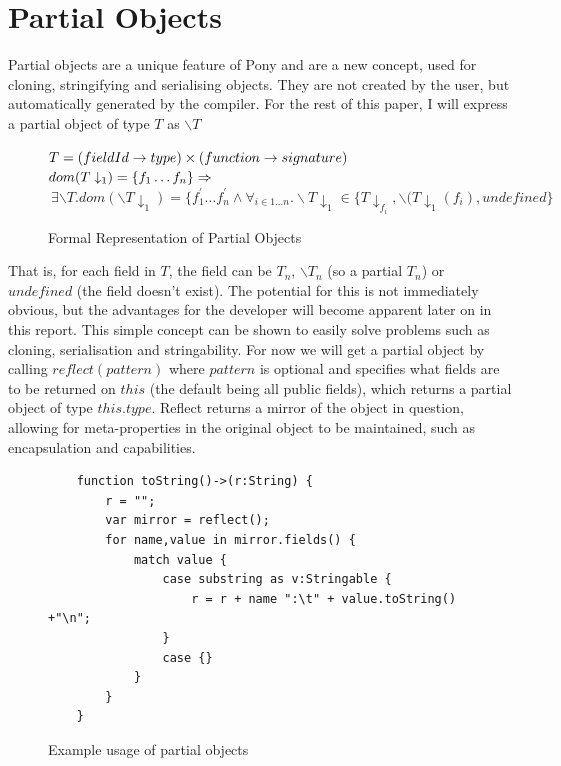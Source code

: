 \documentclass[pdftex,11pt,a4paper]{report}
\begin{document}
\section{Partial Objects}

Partial objects are a unique feature of Pony and are a new concept, used for cloning, stringifying and serialising objects.
They are not created by the user, but automatically generated by the compiler.
For the rest of this paper, I will express a partial object of type $T$ as $\backslash T$

\begin{figure}[H]
$T = (fieldId \to type) \times (function \to signature)\\$
$dom(T\downarrow_{1}) = \{ f_{1} \dots f_{n} \} \Rightarrow\\$
$\> \exists \backslash T.dom(\backslash T\downarrow_{1}) = \{f_{1}^{'}\dots f_{n}^{'}\wedge
\forall_{i\in 1\dots n}.\backslash T\downarrow_{1} \in \{T\downarrow_{f_{i}},
\backslash(T\downarrow_{1}(f_{i}), undefined\}$
\caption{Formal Representation of Partial Objects}
\end{figure}

That is, for each field in $T$, the field can be $T_{n}$, $\backslash T_{n}$ (so a partial $T_{n}$) or $undefined$ (the field doesn't exist).
The potential for this is not immediately obvious, but the advantages for the developer will become apparent later on in this report.
This simple concept can be shown to easily solve problems such as cloning, serialisation and stringability.
For now we will get a partial object by calling $reflect(pattern)$ where $pattern$ is optional and specifies what fields are to be returned on $this$ (the default being all public fields), which returns a partial object of type $this.type$.
Reflect returns a mirror\cite{mirror-paper} of the object in question, allowing for meta-properties in the original object to be maintained, such as encapsulation and capabilities.

\begin{figure}[H]
\begin{verbatim}
    function toString()->(r:String) {
        r = "";
        var mirror = reflect();
        for name,value in mirror.fields() {
            match value {
                case substring as v:Stringable {
                    r = r + name ":\t" + value.toString() +"\n";
                }
                case {}
            }
        }
    }
\end{verbatim}
\caption{Example usage of partial objects}
\label{fig:partialobj}
\end{figure}
\end{document}
